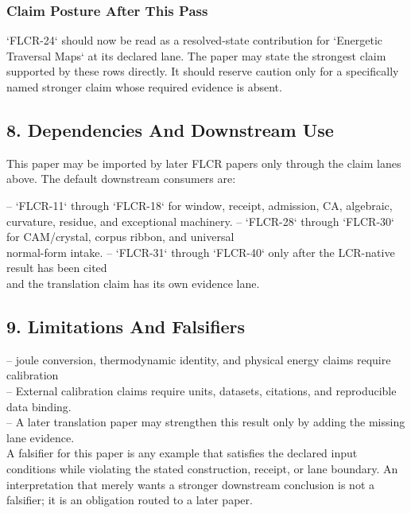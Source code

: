 \documentclass[11pt]{article}
\begin{document}
\subsubsection*{Claim Posture After This Pass}

`FLCR-24` should now be read as a resolved-state contribution for `Energetic Traversal Maps` at its declared lane. The paper may state the strongest claim supported by these rows directly. It should reserve caution only for a specifically named stronger claim whose required evidence is absent.

\subsection*{8. Dependencies And Downstream Use}

This paper may be imported by later FLCR papers only through the claim lanes
above. The default downstream consumers are:

\noindent{}-- `FLCR-11` through `FLCR-18` for window, receipt, admission, CA, algebraic,\\
  curvature, residue, and exceptional machinery.
\noindent{}-- `FLCR-28` through `FLCR-30` for CAM/crystal, corpus ribbon, and universal\\
  normal-form intake.
\noindent{}-- `FLCR-31` through `FLCR-40` only after the LCR-native result has been cited\\
  and the translation claim has its own evidence lane.

\subsection*{9. Limitations And Falsifiers}

\noindent{}-- joule conversion, thermodynamic identity, and physical energy claims require calibration\\
\noindent{}-- External calibration claims require units, datasets, citations, and reproducible data binding.\\
\noindent{}-- A later translation paper may strengthen this result only by adding the missing lane evidence.\\

A falsifier for this paper is any example that satisfies the declared input
conditions while violating the stated construction, receipt, or lane boundary.
An interpretation that merely wants a stronger downstream conclusion is not a
falsifier; it is an obligation routed to a later paper.
\end{document}
